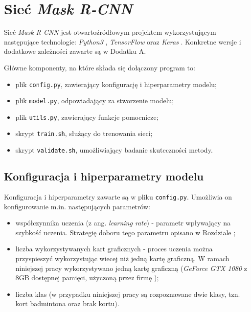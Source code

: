 \newpage
\section{Sieć \textit{Mask R-CNN}}

Sieć \textit{Mask R-CNN} \cite{matterport-mask-rcnn} jest otwartoźródłowym projektem wykorzystującym następujące technologie: \textit{Python3} \cite{python}, \textit{TensorFlow} \cite{tensorflow} oraz \textit{Keras} \cite{keras}. Konkretne wersje i dodatkowe zależności zawarte są w Dodatku A.

Główne komponenty, na które składa się dołączony program to:

\begin{itemize}
  \item plik \texttt{config.py}, zawierający konfigurację i hiperparametry modelu;
  \item plik \texttt{model.py}, odpowiadający za stworzenie modelu;
  \item plik \texttt{utils.py}, zawierający funkcje pomocnicze;
  \item skrypt \texttt{train.sh}, służący do trenowania sieci;
  \item skrypt \texttt{validate.sh}, umożliwiający badanie skuteczności metody.
\end{itemize}

\subsection*{Konfiguracja i hiperparametry modelu}

Konfiguracja i hiperparametry zawarte są w pliku \texttt{config.py}. Umożliwia on konfigurowanie m.in. następujących parametrów:
\begin{itemize}
  \item współczynnika uczenia (z ang. \textit{learning rate}) - parametr wpływający na szybkość uczenia. Strategię doboru tego parametru opisano w Rozdziale ;
  \item liczba wykorzystywanych kart graficznych - proces uczenia można przyspieszyć wykorzystując wiecej niż jedną kartę graficzną. W ramach niniejszej pracy wykorzystywano jedną kartę graficzną (\textit{GeForce GTX 1080} z 8GB dostępnej pamięci, użyczoną przez firmę \blue{});
  \item liczba klas (w przypadku niniejszej pracy są rozpoznawane dwie klasy, tzn. kort badmintona oraz brak kortu).
\end{itemize}

